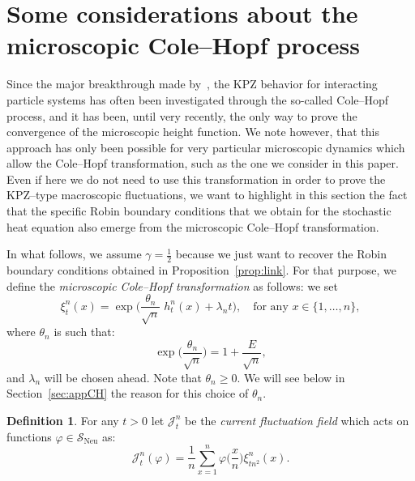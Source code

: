 \documentclass[10pt]{amsart}
\theoremstyle{definition}\newtheorem{defi}[theo]{Definition}\newtheorem{rema}[theo]{Remark}\newtheorem{exam}[theo]{Example}\newtheorem{exem}[theo]{Example}\newtheorem{nota}[theo]{Notation}
\DeclareMathOperator{\Neu}{Neu}
\newcommand{\mc}[1]{{\mathcal #1}}
\renewcommand{\mc}[1]{{\mathcal #1}}
\newcommand{\SN}{\ensuremath{\mc S_{\Neu}}}
\renewcommand{\ge}{\geqslant}
\renewcommand{\tfrac}{\frac}
\begin{document}
\section{Some considerations about the microscopic Cole--Hopf process}\label{app:micro-CH}

Since the major breakthrough made by~\cite{BerG}, the KPZ behavior for interacting particle systems has often been investigated through the so-called Cole--Hopf process, and it has been, until very recently, the only way to prove the convergence of the microscopic height function. We note however, that this approach has only been possible for very particular microscopic dynamics which allow the Cole--Hopf transformation, such as the one we consider in this paper. Even if here we do not need to use this transformation in order to prove the KPZ--type macroscopic fluctuations, we want to highlight in this section the fact that the specific Robin boundary conditions that we obtain for the stochastic heat equation also emerge from the microscopic Cole--Hopf transformation.

In what follows, we assume $\gamma=\tfrac12$ because we just want to recover the Robin boundary conditions obtained in Proposition~\ref{prop:link}. For that purpose, we define the \emph{microscopic Cole--Hopf transformation} as follows: we set
\begin{equation}\label{eq:xitn}
\xi_t^n(x) = \exp\bigg(\tfrac{\theta_n}{\sqrt n} \; h_t^n(x)+\lambda_n t\bigg), \quad \text{for any } x \in \{1,\dots,n\},
\end{equation}
where $\theta_n$ is such that:
\begin{equation}\label{eq:gammalambda}
\exp\bigg(\tfrac{\theta_n}{\sqrt n}\bigg) = 1+ \tfrac{E}{\sqrt n},
\end{equation}
and $\lambda_n$ will be chosen ahead. Note that $\theta_n\ge 0$. We will see below in Section~\ref{sec:appCH} the reason for this choice of $\theta_n$.

\begin{defi}\label{def:current}
For any $t>0$ let $\mc J_t^n$ be the \emph{current fluctuation field} which acts on functions $\varphi \in \SN$ as:
\[
\mc J_t^n(\varphi)=\frac{1}{n} \sum_{x=1}^n \varphi\Big(\tfrac x n \Big) \xi_{tn^2}^n(x).
\]
\end{defi}
\end{document}
